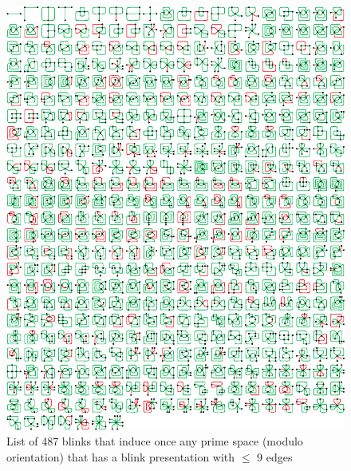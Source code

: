 \begin{figure}[h!tp]
   \begin{center}
      \leavevmode
      \includegraphics[width=15cm]{fig/primeSpace487Representants.eps}
   \end{center}
   \vspace{-0.7cm}
   \caption{ List of 487 blinks that induce once any prime space (modulo orientation)
   that has a blink presentation with $\leq$ 9 edges}
   \label{fig:primeSpace487Representatives}
\end{figure}

\newpage


